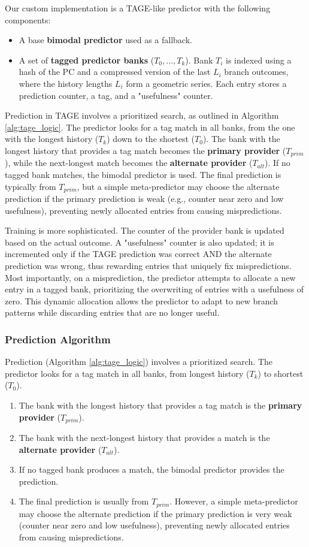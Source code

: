 \documentclass[sigconf, screen]{acmart}
\begin{document}
Our custom implementation is a TAGE-like predictor with the following components:
\begin{itemize}
    \item A base \textbf{bimodal predictor} used as a fallback.
    \item A set of \textbf{tagged predictor banks} ($T_0, \dots, T_k$). Bank $T_i$ is indexed using a hash of the PC and a compressed version of the last $L_i$ branch outcomes, where the history lengths $L_i$ form a geometric series. Each entry stores a prediction counter, a tag, and a "usefulness" counter.
\end{itemize}

Prediction in TAGE involves a prioritized search, as outlined in Algorithm \ref{alg:tage_logic}. The predictor looks for a tag match in all banks, from the one with the longest history ($T_k$) down to the shortest ($T_0$). The bank with the longest history that provides a tag match becomes the \textbf{primary provider} ($T_{prim}$), while the next-longest match becomes the \textbf{alternate provider} ($T_{alt}$). If no tagged bank matches, the bimodal predictor is used. The final prediction is typically from $T_{prim}$, but a simple meta-predictor may choose the alternate prediction if the primary prediction is weak (e.g., counter near zero and low usefulness), preventing newly allocated entries from causing mispredictions.

Training is more sophisticated. The counter of the provider bank is updated based on the actual outcome. A "usefulness" counter is also updated; it is incremented only if the TAGE prediction was correct AND the alternate prediction was wrong, thus rewarding entries that uniquely fix mispredictions. Most importantly, on a misprediction, the predictor attempts to allocate a new entry in a tagged bank, prioritizing the overwriting of entries with a usefulness of zero. This dynamic allocation allows the predictor to adapt to new branch patterns while discarding entries that are no longer useful.

\subsubsection{Prediction Algorithm}
Prediction (Algorithm \ref{alg:tage_logic}) involves a prioritized search. The predictor looks for a tag match in all banks, from longest history ($T_k$) to shortest ($T_0$).
\begin{enumerate}
    \item The bank with the longest history that provides a tag match is the \textbf{primary provider} ($T_{prim}$).
    \item The bank with the next-longest history that provides a match is the \textbf{alternate provider} ($T_{alt}$).
    \item If no tagged bank produces a match, the bimodal predictor provides the prediction.
    \item The final prediction is usually from $T_{prim}$. However, a simple meta-predictor may choose the alternate prediction if the primary prediction is very weak (counter near zero and low usefulness), preventing newly allocated entries from causing mispredictions.
\end{enumerate}
\end{document}
